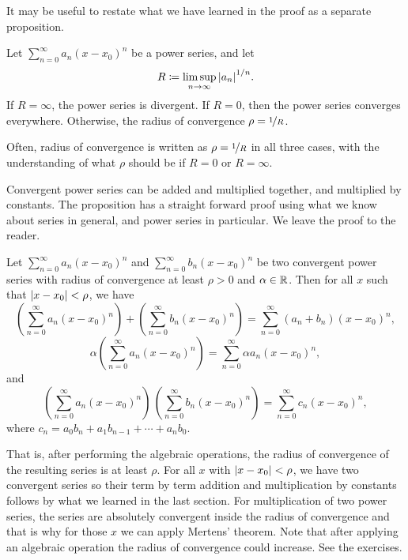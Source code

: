 It may be useful to restate what we have learned in the proof
as a separate proposition.

\begin{prop}
Let $\sum_{n=0}^\infty a_n {(x-x_0)}^n$ be a power series, and let
\begin{equation*}
R \coloneqq \limsup_{n\to\infty} {\left\lvert {a_n} \right\rvert}^{1/n} .
\end{equation*}
If $R = \infty$, the power series is divergent.  If
$R=0$, then the power series converges everywhere.   Otherwise,
the radius of convergence $\rho = \nicefrac{1}{R}$.
\end{prop}

Often, radius of convergence is written as $\rho = \nicefrac{1}{R}$ in all
three cases, with
the understanding of what $\rho$ should be if $R = 0$ or $R =
\infty$.

Convergent power series can be added and multiplied together, and multiplied
by constants.
The proposition has a straight forward proof using what we know about series
in general, and power series in particular.  We leave the proof to the reader.

\begin{prop}
Let $\sum_{n=0}^\infty a_n {(x-x_0)}^n$ and
$\sum_{n=0}^\infty b_n {(x-x_0)}^n$ be two convergent power series
with radius of convergence at least $\rho > 0$ and $\alpha \in {\mathbb{R}}$.  Then
for all $x$ such that $\left\lvert {x-x_0} \right\rvert < \rho$, we have 
\begin{equation*}
\left(\sum_{n=0}^\infty a_n {(x-x_0)}^n\right)
+
\left(\sum_{n=0}^\infty b_n {(x-x_0)}^n\right)
=
\sum_{n=0}^\infty (a_n+b_n) {(x-x_0)}^n ,
\end{equation*}
\begin{equation*}
\alpha
\left(\sum_{n=0}^\infty a_n {(x-x_0)}^n\right)
=
\sum_{n=0}^\infty \alpha a_n {(x-x_0)}^n ,
\end{equation*}
and
\begin{equation*}
\left(\sum_{n=0}^\infty a_n {(x-x_0)}^n\right)
\,
\left(\sum_{n=0}^\infty b_n {(x-x_0)}^n\right)
=
\sum_{n=0}^\infty c_n {(x-x_0)}^n ,
\end{equation*}
where
$c_n = a_0b_n + a_1 b_{n-1} + \cdots + a_n b_0$.
\end{prop}

That is, after performing the algebraic operations, the
radius of convergence of the resulting series is at least $\rho$.
For all $x$ with $\left\lvert {x-x_0} \right\rvert < \rho$, we have two convergent series so
their term by term addition and multiplication by constants
follows by what we learned in the last section.
For multiplication of two power series,
the series are absolutely convergent inside
the radius of convergence and that is why for those $x$
we can apply Mertens' theorem.
Note that after applying an algebraic operation the radius of convergence
could increase.  See the exercises.

